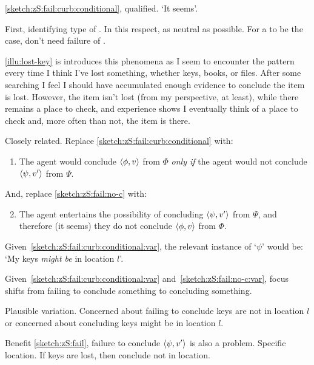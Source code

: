 \begin{note}
  \ref{sketch:zS:fail:curb:conditional}, qualified.
  `It seems'.

  First, identifying type of \scen{}.
  In this respect, as neutral as possible.
  For a \scen{} to be the case, don't need failure of \issueConstraint{}.
\end{note}

\begin{note}
  \autoref{illu:lost-key} is introduces this phenomena as I seem to encounter the pattern every time I think I've lost something, whether keys, books, or files.
  After some searching I feel I should have accumulated enough evidence to conclude the item is lost.
  However, the item isn't lost (from my perspective, at least), while there remains a place to check, and experience shows I eventually think of a place to check and, more often than not, the item is there.
\end{note}

\begin{note}
  Closely related.
  Replace \ref{sketch:zS:fail:curb:conditional} with:
  \begin{enumerate}[label=\alph*\('\)., ref=(\alph*\('\))]
  \item
    \label{sketch:zS:fail:curb:conditional:var}
    The agent would conclude \(\langle \phi, v \rangle\) from \(\Phi\) \emph{only if} the agent would not conclude \(\langle \psi, v' \rangle\) from \(\Psi\).
  \end{enumerate}
  And, replace \ref{sketch:zS:fail:no-c} with:
  \begin{enumerate}[label=\arabic*\('\)., ref=(\arabic*\('\))]
    \setcounter{enumi}{1}
  \item
    \label{sketch:zS:fail:no-c:var}
    The agent entertains the possibility of concluding \(\langle \psi, v' \rangle\) from \(\Psi\), and therefore (it seems) they do not conclude \(\langle \phi, v \rangle\) from \(\Phi\).
  \end{enumerate}

  Given~\ref{sketch:zS:fail:curb:conditional:var}, the relevant instance of `\(\psi\)' would be: `My keys \emph{might be} in location \(l\)'.

  Given~\ref{sketch:zS:fail:curb:conditional:var} and~\ref{sketch:zS:fail:no-c:var}, focus shifts from failing to conclude something to concluding something.

  Plausible variation.
  Concerned about failing to conclude keys are not in location \(l\) or concerned about concluding keys might be in location \(l\).

  Benefit \ref{sketch:zS:fail}, failure to conclude \(\langle \psi, v' \rangle\) is also a problem.
  Specific location.
  If keys are lost, then conclude not in location.
\end{note}

